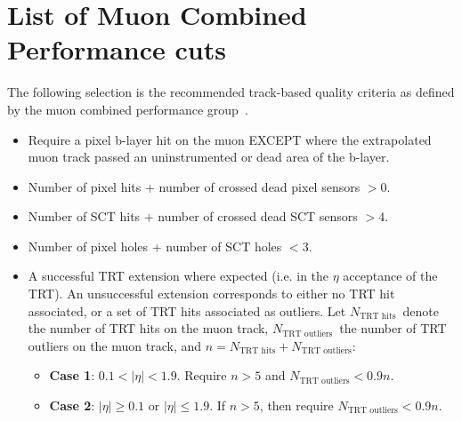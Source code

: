 \newcommand{\trtHits}{\ensuremath{N_{\textrm{TRT hits}}}}
\newcommand{\trtOut}{\ensuremath{N_{\textrm{TRT outliers}}}}

\chapter{List of Muon Combined Performance cuts} \label{app:CalibrationMCPCuts}

The following selection is the recommended track-based quality criteria as defined by the muon combined performance group~\cite{Calibration:MCP2012}.

\begin{itemize}
  \item Require a pixel b-layer hit on the muon EXCEPT where the extrapolated muon track passed an uninstrumented or dead area of the b-layer.
  \item Number of pixel hits + number of crossed dead pixel sensors $>0$.
  \item Number of SCT hits + number of crossed dead SCT sensors $>4$.
  \item Number of pixel holes + number of SCT holes $<3$.
  \item A successful TRT extension where expected (i.e. in the $\eta$ acceptance of the TRT). An unsuccessful extension corresponds to either no TRT hit associated, or a set of TRT hits associated as outliers. Let \trtHits\ denote the number of TRT hits on the muon track, \trtOut\ the number of TRT outliers on the muon track, and $n=\trtHits + \trtOut$:
  \begin{itemize}
    \item \textbf{Case 1}: $0.1<|\eta|<1.9$. Require $n>5$ and $\trtOut<0.9n$.
    \item \textbf{Case 2}: $|\eta|\geq0.1$ or $|\eta|\leq1.9$. If $n>5$, then require $\trtOut<0.9n$.
  \end{itemize}
\end{itemize}
